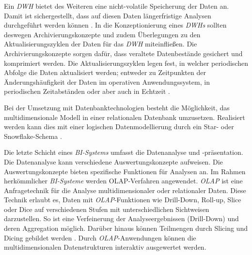 Ein \textit{\acrlong{DWH}} bietet des Weiteren eine nicht-volatile Speicherung der Daten an. Damit ist sichergestellt, dass auf diesen Daten längerfristige Analysen durchgeführt werden können \cite[vgl.][136]{linden_geschaftsmodellbasierte_2016}.
In die Konzeptionierung eines \textit{\acrlong{DWH}s} sollten deswegen Archivierungskonzepte und zudem Überlegungen zu den Aktualisierungszyklen der Daten für das \textit{\acrshort{DWH}}
miteinfließen. Die Archivierungskonzepte sorgen dafür, dass veraltete Datenbestände gesichert und komprimiert werden.
Die Aktualisierungszyklen legen fest, in welcher periodischen Abfolge die Daten aktualisiert werden; entweder zu Zeitpunkten der Änderungshäufigkeit
der Daten im operativen Anwendungssystem, in periodischen Zeitabständen oder aber auch in Echtzeit \cite[vgl.][137]{linden_geschaftsmodellbasierte_2016}.

Bei der Umsetzung mit Datenbanktechnologien besteht die Möglichkeit, das multidimensionale Modell in einer relationalen Datenbank umzusetzen.  
Realisiert werden kann dies mit einer logischen Datenmodellierung durch ein Star- oder Snowflake-Schema \cite[vgl.][177 f.]{linden_geschaftsmodellbasierte_2016}.




Die letzte Schicht eines \textit{\acrshort{BI}-Systems} umfasst die Datenanalyse und -präsentation. Die Datenanalyse kann verschiedene Auswertungskonzepte aufweisen.
Die Auswertungskonzepte bieten spezifische Funktionen für Analysen an. Im Rahmen herkömmlicher \textit{\acrshort{BI}-Systeme} werden \acrfull{OLAP}-Verfahren angewendet. 
\textit{\acrshort{OLAP}} ist eine Anfragetechnik für die Analyse multidimensionaler oder relationaler Daten. Diese Technik erlaubt es, Daten mit \textit{\acrshort{OLAP}}-Funktionen 
wie Drill-Down, Roll-up, Slice oder Dice auf verschiedenen Stufen mit unterschiedlichen Sichtweisen darzustellen. So ist eine Verfeinerung der Analyseergebnissen (Drill-Down) und 
deren Aggregation möglich. Darüber hinaus können Teilmengen durch Slicing und Dicing gebildet werden \cite[vgl.][283 f.]{abts_grundkurs_2017}. 
Durch \textit{\acrshort{OLAP}}-Anwendungen können die multidimensionalen Datenstrukturen interaktiv ausgewertet werden.

